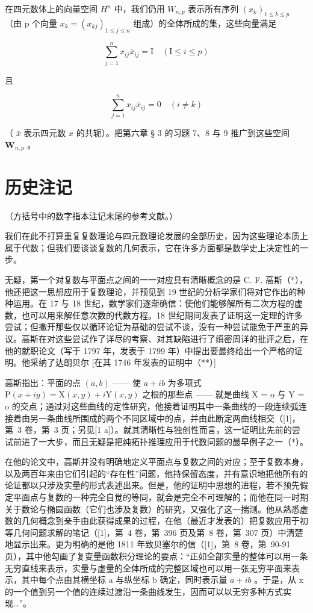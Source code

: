 在四元数体上的向量空间 \(H^{n}\) 中，我们仍用 \(W_{n,p}\) 表示所有序列 \((x_{k})_{1\leqslant k\leqslant p}\) （由 p 个向量 \(x_{k}=(x_{kj})_{1\leqslant j\leqslant n}\) 组成）的全体所成的集，这些向量满足

\[
\sum_ {j = 1} ^ {n} x _ {i j} \overline {{{x}}} _ {i j} = \mathrm{I} \quad (\mathrm{I} \leqslant i \leqslant p)
\]

且

\[
\sum_ {j = 1} ^ {n} x _ {i j} \bar {x} _ {i j} = 0 \quad (i \neq k)
\]

（ \(\bar{x}\) 表示四元数 \(x\) 的共轭）。把第六章 § 3 的习题 7、8 与 9 推广到这些空间 \(\mathbf{W}_{n,p}\) 。

\section*{历史注记}
{}

（方括号中的数字指本注记末尾的参考文献。）

我们在此不打算重复复数理论与四元数理论发展的全部历史，因为这些理论本质上属于代数；但我们要谈谈复数的几何表示，它在许多方面都是数学史上决定性的一步。

无疑，第一个对复数与平面点之间的一一对应具有清晰概念的是 C. F. 高斯（*），他还把这一思想应用于复数理论，并预见到 19 世纪的分析学家们将对它作出的种种运用。在 17 与 18 世纪，数学家们逐渐确信：使他们能够解所有二次方程的虚数，也可以用来解任意次数的代数方程。18 世纪期间发表了证明这一定理的许多尝试；但撇开那些仅以循环论证为基础的尝试不谈，没有一种尝试能免于严重的异议。高斯在对这些尝试作了详尽的考察、对其缺陷进行了缜密周详的批评之后，在他的就职论文（写于 1797 年，发表于 1799 年）中提出要最终给出一个严格的证明。他采纳了达朗贝尔 {[}在其 1746 年发表的证明中（**）{]}

高斯指出：平面的点 \((a, b)\) —— 使 \(a + ib\) 为多项式 \(\mathrm{P}(x + iy) = \mathrm{X}(x, y) + i\mathrm{Y}(x, y)\) 之根的那些点 —— 就是曲线 X = o 与 Y = o 的交点；通过对这些曲线的定性研究，他接着证明其中一条曲线的一段连续弧连接着由另一条曲线所围成的两个不同区域中的点，并由此断定两曲线相交（{[}1{]}，第~3 卷，第~3 页；另见{[}1 a{]}）。就其清晰性与独创性而言，这一证明比先前的尝试前进了一大步，而且无疑是把纯拓扑推理应用于代数问题的最早例子之一（*）。

在他的论文中，高斯并没有明确地定义平面点与复数之间的对应；至于复数本身，以及两百年来由它们引起的“存在性”问题，他持保留态度，并有意识地把他所有的论证都以只涉及实量的形式表述出来。但是，他的证明中思想的进程，若不预先假定平面点与复数的一种完全自觉的等同，就会是完全不可理解的；而他在同一时期关于数论与椭圆函数（它们也涉及复数）的研究，又强化了这一揣测。他从熟悉虚数的几何概念到亲手由此获得成果的过程，在他（最近才发表的）把复数应用于初等几何问题求解的笔记（{[}1{]}，第~4 卷，第~396 页及第~8 卷，第~307 页）中清楚地显示出来。更为明确的是他 1811 年致贝塞尔的信（{[}1{]}，第~8 卷，第~90-91 页），其中他勾画了复变量函数积分理论的要点：“正如全部实量的整体可以用一条无穷直线来表示，实量与虚量的全体所成的完整区域也可以用一张无穷平面来表示，其中每个点由其横坐标 a 与纵坐标 b 确定，同时表示量 \(a + ib\) 。于是，从 x 的一个值到另一个值的连续过渡沿一条曲线发生，因而可以以无穷多种方式实现\ldots”。

